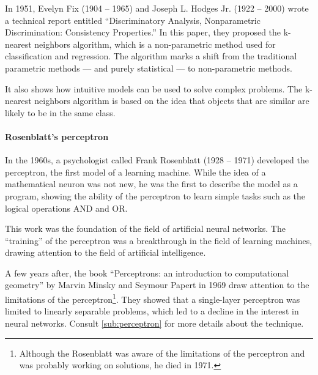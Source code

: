 In 1951, Evelyn Fix (1904 -- 1965) and Joseph L. Hodges Jr. (1922 -- 2000) wrote a
technical report entitled ``Discriminatory Analysis, Nonparametric Discrimination:
Consistency Properties.''  In this paper, they proposed the k-nearest neighbors algorithm,
which is a non-parametric method used for classification and regression.  The algorithm
marks a shift from the traditional parametric methods --- and purely statistical ---
to non-parametric methods.

It also shows how intuitive models can be used to solve complex problems.  The k-nearest
neighbors algorithm is based on the idea that objects that are similar are likely to be in
the same class.


\paragraph{Rosenblatt's perceptron}

In the 1960s, a psychologist called Frank Rosenblatt (1928 -- 1971) developed the perceptron, the first model of
a learning machine.  While the idea of a mathematical neuron was not new, he was the first
to describe the model as a program, showing the ability of the perceptron to learn simple
tasks such as the logical operations AND and OR.

This work was the foundation of the field of artificial neural networks.  The ``training''
of the perceptron was a breakthrough in the field of learning machines, drawing attention
to the field of artificial intelligence.


A few years after, the book ``Perceptrons: an introduction to computational geometry'' by
Marvin Minsky and Seymour Papert in 1969 draw attention to the limitations of the
perceptron\footnote{Although the Rosenblatt was aware of the limitations of the perceptron
and was probably working on solutions, he died in 1971.}. They showed that a single-layer
perceptron was limited to linearly separable problems, which led to a decline in the
interest in neural networks.
Consult \cref{sub:perceptron} for more details about the technique.

